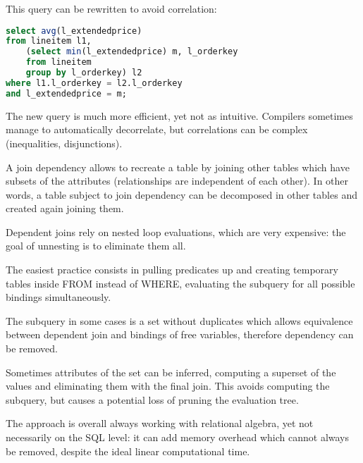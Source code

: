 This query can be rewritten to avoid correlation:
\begin{lstlisting}[language=SQL]
select avg(l_extendedprice)
from lineitem l1,
	(select min(l_extendedprice) m, l_orderkey
	from lineitem
	group by l_orderkey) l2
where l1.l_orderkey = l2.l_orderkey
and l_extendedprice = m;
\end{lstlisting}

The new query is much more efficient, yet not as intuitive. Compilers sometimes manage to automatically decorrelate, but correlations can be complex (inequalities, disjunctions).

A join dependency allows to recreate a table by joining other tables which have subsets of the attributes (relationships are independent of each other). In other words, a table subject to join dependency can be decomposed in other tables and created again joining them.

Dependent joins rely on nested loop evaluations, which are very expensive: the goal of unnesting is to eliminate them all.

The easiest practice consists in pulling predicates up and creating temporary tables inside FROM instead of WHERE, evaluating the subquery for all possible bindings simultaneously. 

The subquery in some cases is a set without duplicates which allows equivalence between dependent join and bindings of free variables, therefore dependency can be removed.

Sometimes attributes of the set can be inferred, computing a superset of the values and eliminating them with the final join. This avoids computing the subquery, but causes a potential loss of pruning the evaluation tree.

The approach is overall always working with relational algebra, yet not necessarily on the SQL level: it can add memory overhead which cannot always be removed, despite the ideal linear computational time.

